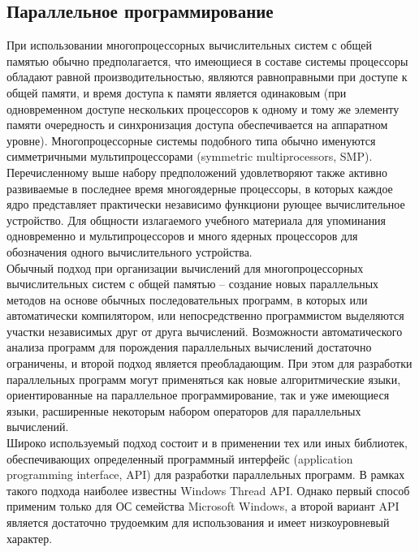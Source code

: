 \documentclass[a4paper, 12pt]{article}
\begin{document}
\begin{flushleft}
	\subsection{Параллельное программирование}
	\hspace*{5mm} При использовании многопроцессорных вычислительных систем с общей памятью обычно предполагается, что имеющиеся в составе системы процессоры обладают равной производительностью, являются равноправными при доступе к общей памяти, и время доступа к памяти является одинаковым (при одновременном доступе нескольких процессоров к одному и тому же элементу памяти очередность и синхронизация доступа обеспечивается на аппаратном уровне). Многопроцессорные системы подобного типа обычно именуются симметричными мультипроцессорами (symmetric multiprocessors, SMP).
	\\ \hspace*{5mm} Перечисленному выше набору предположений удовлетворяют также активно развиваемые в последнее время многоядерные процессоры, в которых каждое ядро представляет практически независимо функциони рующее вычислительное устройство. Для общности излагаемого учебного материала для упоминания одновременно и мультипроцессоров и много ядерных процессоров для обозначения одного вычислительного устройства.
	\\ \hspace*{5mm} Обычный подход при организации вычислений для многопроцессорных вычислительных систем с общей памятью – создание новых параллельных методов на основе обычных последовательных программ, в которых или автоматически компилятором, или непосредственно программистом выделяются участки независимых друг от друга вычислений. Возможности автоматического анализа программ для порождения параллельных вычислений достаточно ограничены, и второй подход является преобладающим. При этом для разработки параллельных программ могут применяться как новые алгоритмические языки, ориентированные на параллельное программирование, так и уже имеющиеся языки, расширенные некоторым набором операторов для параллельных вычислений.
	\\ \hspace*{5mm} Широко используемый подход состоит и в применении тех или иных библиотек, обеспечивающих определенный программный интерфейс (application programming interface, API) для разработки параллельных программ. В рамках такого подхода наиболее известны Windows Thread API. Однако первый способ применим только для ОС семейства Microsoft Windows, а второй вариант API является достаточно трудоемким для использования и имеет низкоуровневый характер. \cite{paral}

\end{flushleft}
\end{document}
